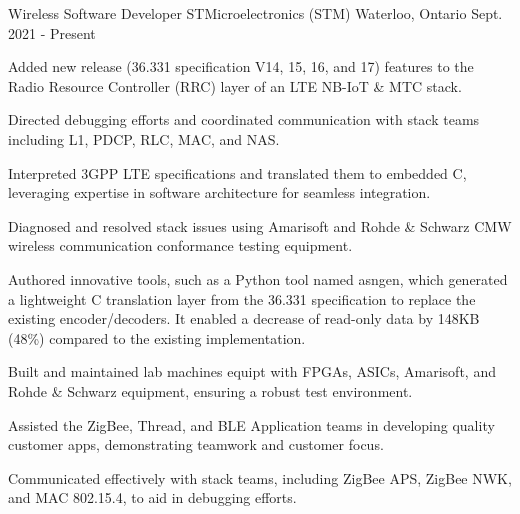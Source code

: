 
\begin{cventries}

  \cventry
    {Wireless Software Developer} %
    {STMicroelectronics (STM)} %
    {Waterloo, Ontario} %
    {Sept. 2021 - Present} %
    {
      \begin{cvitems} %
        \item {Added new release (36.331 specification V14, 15, 16, and 17) features to the Radio Resource Controller (RRC) layer of an LTE NB-IoT \& MTC stack.}
        \item {Directed debugging efforts and coordinated communication with stack teams including L1, PDCP, RLC, MAC, and NAS.}
        \item {Interpreted 3GPP LTE specifications and translated them to embedded C, leveraging expertise in software architecture for seamless integration.}
        \item {Diagnosed and resolved stack issues using Amarisoft and Rohde \& Schwarz CMW wireless communication conformance testing equipment.}
        \item {Authored innovative tools, such as a Python tool named asngen, which generated a lightweight C translation layer from the 36.331 specification to replace the existing encoder/decoders. It enabled a decrease of read-only data by 148KB (48\%) compared to the existing implementation.}
        \item {Built and maintained lab machines equipt with FPGAs, ASICs, Amarisoft, and Rohde \& Schwarz equipment, ensuring a robust test environment.}
        \item {Assisted the ZigBee, Thread, and BLE Application teams in developing quality customer apps, demonstrating teamwork and customer focus.}
        \item {Communicated effectively with stack teams, including ZigBee APS, ZigBee NWK, and MAC 802.15.4, to aid in debugging efforts.}
      \end{cvitems}
    }


\end{cventries}
